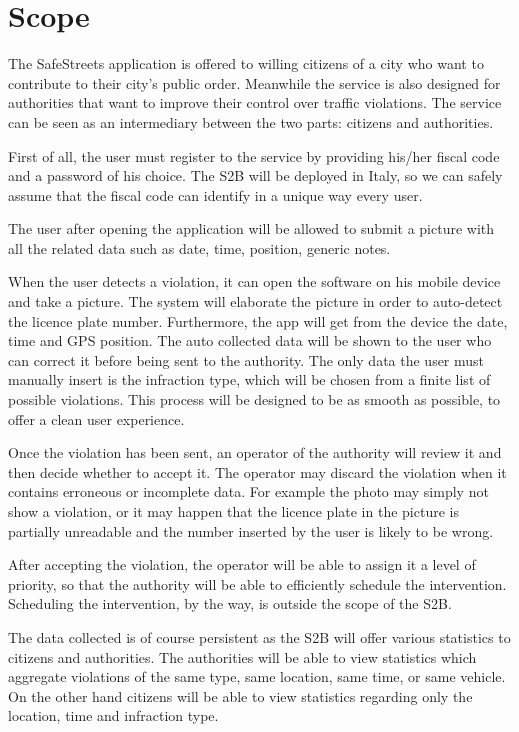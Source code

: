 \section{Scope}
The SafeStreets application is offered to willing citizens of a city who want 
to contribute to their city’s public order. Meanwhile the service is also 
designed for authorities that want to improve their control over traffic 
violations. 
The service can be seen as an intermediary between the two parts: citizens 
and authorities.


First of all, the user must register to the service by providing his/her 
fiscal code and a password of his choice. The S2B will be deployed in 
Italy, so we can safely assume that the fiscal code can identify in a 
unique way every user.

The user after opening the application will be allowed to submit a picture 
with all the related data such as date, time, position, generic notes.

When the user detects a violation, it can open the software on his mobile 
device and take a picture. The system will elaborate the picture in order to 
auto-detect the licence plate number. Furthermore, the app will get from the 
device the date, time and GPS position. The auto collected data will be shown 
to the user who can correct it before being sent to the authority.
The only data the user must manually insert is the infraction type, which 
will be chosen from a finite list of possible violations.
This process will be designed to be as smooth as possible, to offer a clean 
user experience.

Once the violation has been sent, an operator of the authority will review
it and then decide whether to accept it. The operator may discard the
violation when it contains erroneous or incomplete data. For example the
photo may simply not show a violation, or it may happen that the licence
plate in the picture is partially unreadable and the number inserted by
the user is likely to be wrong.

After accepting the violation, the operator will be able to assign it a level
of priority, so that the authority will be able to efficiently schedule the
intervention. Scheduling the intervention, by the way, is outside the scope
of the S2B.

The data collected is of course persistent as the S2B will offer various
statistics to citizens and authorities.
The authorities will be able to view statistics which aggregate violations
of the same type, same location, same time, or same vehicle.
On the other hand citizens will be able to view statistics regarding only 
the location, time and infraction type.